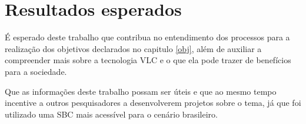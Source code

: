 \chapter{Resultados esperados}

É esperado deste trabalho que contribua no entendimento dos processos para a realização dos objetivos declarados no capitulo \ref{obj}, além de auxiliar a compreender mais sobre a tecnologia VLC e o que ela pode trazer de benefícios para a sociedade.

Que as informações deste trabalho possam ser úteis e que ao mesmo tempo incentive a outros pesquisadores a desenvolverem projetos sobre o tema, já que foi utilizado uma SBC mais acessível para o cenário brasileiro.
